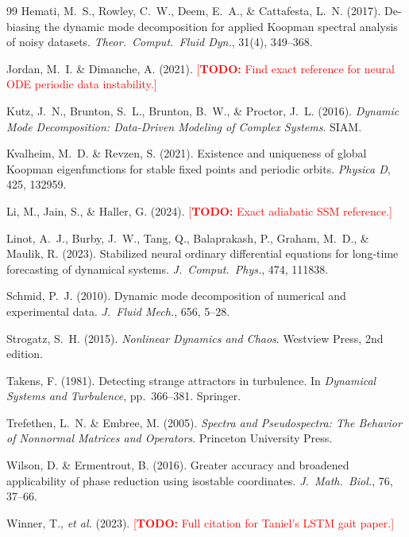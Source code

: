 \documentclass[12pt]{article}
\newcommand{\todo}[1]{\textcolor{red}{[\textbf{TODO:} #1]}}
\begin{document}
\begin{thebibliography}{99}
Hemati, M.~S., Rowley, C.~W., Deem, E.~A., \& Cattafesta, L.~N. (2017).
De-biasing the dynamic mode decomposition for applied Koopman spectral
analysis of noisy datasets.
\textit{Theor.\ Comput.\ Fluid Dyn.}, 31(4), 349--368.

Jordan, M.~I. \& Dimanche, A. (2021).
\todo{Find exact reference for neural ODE periodic data instability.}

Kutz, J.~N., Brunton, S.~L., Brunton, B.~W., \& Proctor, J.~L. (2016).
\textit{Dynamic Mode Decomposition: Data-Driven Modeling of Complex Systems}.
SIAM.

Kvalheim, M.~D. \& Revzen, S. (2021).
Existence and uniqueness of global Koopman eigenfunctions for stable
fixed points and periodic orbits.
\textit{Physica D}, 425, 132959.

Li, M., Jain, S., \& Haller, G. (2024).
\todo{Exact adiabatic SSM reference.}

Linot, A.~J., Burby, J.~W., Tang, Q., Balaprakash, P., Graham, M.~D.,
\& Maulik, R. (2023).
Stabilized neural ordinary differential equations for long-time
forecasting of dynamical systems.
\textit{J.\ Comput.\ Phys.}, 474, 111838.

Schmid, P.~J. (2010).
Dynamic mode decomposition of numerical and experimental data.
\textit{J.\ Fluid Mech.}, 656, 5--28.

Strogatz, S.~H. (2015).
\textit{Nonlinear Dynamics and Chaos}.
Westview Press, 2nd edition.

Takens, F. (1981).
Detecting strange attractors in turbulence.
In \textit{Dynamical Systems and Turbulence}, pp.\ 366--381. Springer.

Trefethen, L.~N. \& Embree, M. (2005).
\textit{Spectra and Pseudospectra: The Behavior of Nonnormal Matrices
and Operators}.
Princeton University Press.

Wilson, D. \& Ermentrout, B. (2016).
Greater accuracy and broadened applicability of phase reduction using
isostable coordinates.
\textit{J.\ Math.\ Biol.}, 76, 37--66.

Winner, T., \emph{et al.} (2023).
\todo{Full citation for Taniel's LSTM gait paper.}

\end{thebibliography}
\end{document}
